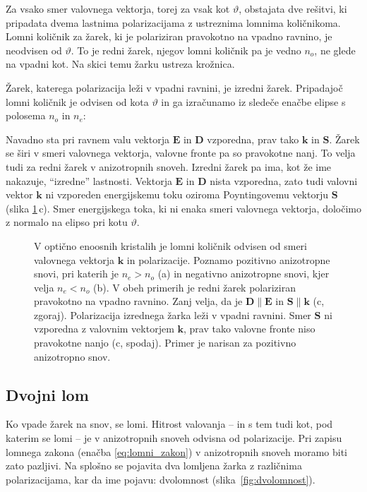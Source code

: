 Za vsako smer valovnega vektorja, torej za vsak kot $\vartheta$, obstajata dve rešitvi, 
ki pripadata dvema lastnima polarizacijama z ustreznima lomnima količnikoma. 
Lomni količnik za žarek, ki je polariziran pravokotno na vpadno ravnino, 
je neodvisen od $\vartheta$. To je redni žarek, njegov lomni količnik 
pa je vedno $n_o$, ne glede na vpadni kot. Na skici temu žarku ustreza krožnica.

Žarek, katerega polarizacija leži v vpadni ravnini, je izredni žarek. Pripadajoč
lomni količnik je odvisen od kota $\vartheta$ in 
ga izračunamo iz sledeče enačbe elipse s polosema $n_o$ in $n_e$: 

Navadno sta pri ravnem valu vektorja $\mathbf{E}$ in $\mathbf{D}$ vzporedna, 
prav tako $\mathbf{k}$ in $\mathbf{S}$. Žarek se širi v smeri valovnega vektorja, 
valovne fronte pa so pravokotne nanj. To velja tudi za redni žarek v anizotropnih
snoveh. Izredni žarek pa ima, kot že ime nakazuje, ``izredne'' lastnosti. Vektorja
$\mathbf{E}$ in $\mathbf{D}$ nista vzporedna, zato tudi valovni vektor $\mathbf{k}$ ni vzporeden
energijskemu toku oziroma Poyntingovemu vektorju $\mathbf{S}$ (slika \ref{fig:Elipsa}\,c). 
Smer energijskega toka, ki ni enaka smeri valovnega vektorja, določimo z normalo 
na elipso pri kotu $\vartheta$. 

\begin{figure}[h]
\centering
\def\svgwidth{140truemm} 

\caption{V optično enoosnih kristalih je lomni količnik odvisen
od smeri valovnega vektorja $\mathbf{k}$ in polarizacije. Poznamo pozitivno anizotropne snovi, pri katerih
je $n_e>n_o$ (a) in negativno anizotropne snovi, kjer velja $n_e< n_o$ (b). V obeh primerih je redni 
žarek polariziran pravokotno na vpadno ravnino. Zanj velja, 
da je $\mathbf{D} \parallel \mathbf{E}$ in $\mathbf{S} \parallel \mathbf{k}$ (c, zgoraj). Polarizacija 
izrednega žarka leži v vpadni ravnini. Smer $\mathbf{S}$ ni vzporedna z valovnim vektorjem
$\mathbf{k}$, prav tako valovne fronte niso pravokotne nanjo (c, spodaj). Primer je narisan za pozitivno 
anizotropno snov.}
\label{fig:Elipsa}
\end{figure}
\subsection*{Dvojni lom}
Ko vpade žarek na snov, se lomi. Hitrost valovanja -- in s tem tudi 
kot, pod katerim se lomi -- je v anizotropnih snoveh odvisna od polarizacije.
Pri zapisu lomnega zakona (enačba \ref{eq:lomni_zakon}) 
v anizotropnih snoveh moramo biti zato pazljivi. Na splošno
se pojavita dva lomljena žarka z različnima polarizacijama, kar
da ime pojavu: dvolomnost (slika~\ref{fig:dvolomnost}). 

